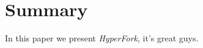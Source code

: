 \section{Summary} \label{sec:conclusions}
In this paper we present \emph{HyperFork}, it's great guys. 
